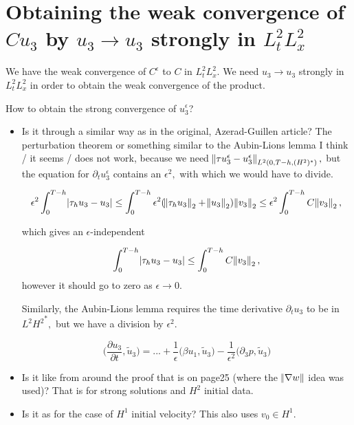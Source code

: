 \documentclass[11pt]{article}
\begin{document}
\section{Obtaining the weak convergence of $C u_3$ by $u_3 \to u_3$ strongly in $L^2_t L^2_x$}

We have the weak convergence of $C^\epsilon$ to $C$ in $L^2_t L^2_x.$ We need $u_3 \to u_3$ strongly in $L^2_t L^2_x$ in order to obtain the weak convergence of the product.

How to obtain the strong convergence of $u_3^\epsilon$?

\begin{itemize}

\item Is it \textcolor{ao}{through a similar way as in the original, Azerad-Guillen article}? The perturbation theorem or something similar to the Aubin-Lions lemma I think / it seems / does not work,
 because we need $\norm{\tau u_3^\epsilon - u_3^\epsilon}_{L^2(0, T-h, (H^2)^*)},$ but the equation for $\partial_t u^\epsilon_3$ contains an $\epsilon^2,$ with which we would have to divide.
 
 $$ \epsilon^2 \int_0^{T-h} \abs{\tau_h u_3 - u_3} \leq \int_0^{T-h} \epsilon^2 (\norm{\tau_h u_3}_2 + \norm{u_3}_2)\norm{v_3}_2 \leq \epsilon^2 \int_0 ^{T-h} C \norm{v_3}_2,$$
 
 which gives an $\epsilon$-independent
 
  $$ \int_0^{T-h} \abs{\tau_h u_3 - u_3} \leq \int_0 ^{T-h} C \norm{v_3}_2,$$ however it should go to zero as $\epsilon \to 0.$
  
  Similarly, the Aubin-Lions lemma requires the time derivative $\partial_t u_3$ to be in $L^2 {H^2}^*,$ but we have a division by $\epsilon^2.$
  
  $$ \bigg ( \frac{\partial u_3}{\partial t}, \tilde{u}_3 \bigg) = ... + \frac{1}{\epsilon} \bigg ( \beta u_1, \tilde{u}_3 \bigg) - \frac{1}{\epsilon^2} \bigg ( \partial_3 p, \tilde{u}_3 \bigg)$$
 
\item Is it \textcolor{cadmiumorange}{like from around the proof that is on page25 (where the $\norm{\nabla w}$ idea was used)}? That is for strong solutions and $H^2$ initial data.

\item Is it \textcolor{trueblue}{as for the case of $H^1$ initial velocity}? This also uses $v_0 \in H^1.$

\end{itemize}
\end{document}
